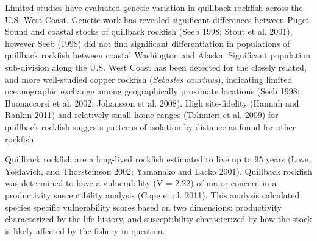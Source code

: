 \documentclass[11pt,
  english,
  a4paper,
]{article}
\begin{document}
\leavevmode\tagmcend\tagstructend\par


Limited studies have evaluated genetic variation in quillback rockfish across the U.S. West Coast. Genetic work has revealed significant differences between Puget Sound and coastal stocks of quillback rockfish {(Seeb 1998; Stout et al. 2001)\leavevmode\tagmcend\tagstructend}, however Seeb {(1998)\leavevmode\tagmcend\tagstructend} did not find significant differentiation in populations of quillback rockfish between coastal Washington and Alaska. Significant population sub-division along the U.S. West Coast has been detected for the closely related, and more well-studied copper rockfish (\emph{Sebastes caurinus}), indicating limited oceanographic exchange among geographically proximate locations {(Seeb 1998; Buonaccorsi et al. 2002; Johansson et al. 2008)\leavevmode\tagmcend\tagstructend}. High site-fidelity {(Hannah and Rankin 2011)\leavevmode\tagmcend\tagstructend} and relatively small home ranges {(Tolimieri et al. 2009)\leavevmode\tagmcend\tagstructend} for quillback rockfish suggests patterns of isolation-by-distance as found for other rockfish.

\leavevmode\tagmcend\tagstructend\par


Quillback rockfish are a long-lived rockfish estimated to live up to 95 years {(Love, Yoklavich, and Thorsteinson 2002; Yamanako and Lacko 2001)\leavevmode\tagmcend\tagstructend}. Quillback rockfish was determined to have a vulnerability (V = 2.22) of major concern in a productivity susceptibility analysis {(Cope et al. 2011)\leavevmode\tagmcend\tagstructend}. This analysis calculated species specific vulnerability scores based on two dimensions: productivity characterized by the life history, and susceptibility characterized by how the stock is likely affected by the fishery in question.

\leavevmode\tagmcend\tagstructend\par
\end{document}
